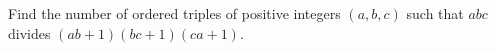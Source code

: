 Find the number of ordered triples of positive integers $(a,b,c)$ such that $abc$ divides $(ab+1)(bc+1)(ca+1)$.
